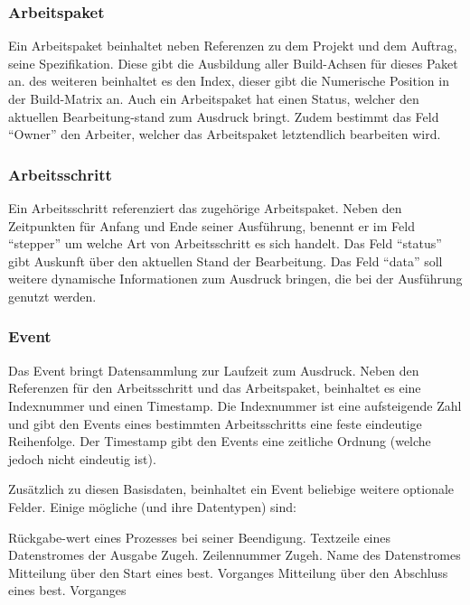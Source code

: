 \subsubsection{Arbeitspaket}
Ein Arbeitspaket beinhaltet neben Referenzen zu dem Projekt und dem Auftrag,
seine Spezifikation. Diese gibt die Ausbildung aller Build-Achsen für dieses Paket an.
des weiteren beinhaltet es den Index, dieser gibt die Numerische Position in der Build-Matrix an.
Auch ein Arbeitspaket hat einen Status, welcher den aktuellen Bearbeitung-stand zum Ausdruck bringt.
Zudem bestimmt das Feld ``Owner'' den Arbeiter, welcher das Arbeitspaket letztendlich bearbeiten wird.

\subsubsection{Arbeitsschritt}

Ein Arbeitsschritt referenziert das zugehörige Arbeitspaket.
Neben den Zeitpunkten für Anfang und Ende seiner Ausführung,
benennt er im Feld ``stepper'' um welche Art von Arbeitsschritt es sich handelt.
Das Feld ``status'' gibt Auskunft über den aktuellen Stand der Bearbeitung.
Das Feld ``data'' soll weitere dynamische Informationen zum Ausdruck bringen,
die bei der Ausführung genutzt werden.



\subsubsection{Event}

Das Event bringt Datensammlung zur Laufzeit zum Ausdruck.
Neben den Referenzen für den Arbeitsschritt und das Arbeitspaket,
beinhaltet es eine Indexnummer und einen Timestamp.
Die Indexnummer ist eine aufsteigende Zahl
und gibt den Events eines bestimmten Arbeitsschritts eine feste eindeutige Reihenfolge.
Der Timestamp gibt den Events eine zeitliche Ordnung (welche jedoch nicht eindeutig ist).


Zusätzlich zu diesen Basisdaten, beinhaltet ein Event beliebige weitere optionale Felder.
Einige mögliche (und ihre Datentypen) sind:

\begin{description}
     Rückgabe-wert eines Prozesses bei seiner Beendigung.
     Textzeile eines Datenstromes der Ausgabe
     Zugeh. Zeilennummer
     Zugeh. Name des Datenstromes
     Mitteilung über den Start eines best. Vorganges
     Mitteilung über den Abschluss eines best. Vorganges
\end{description}




